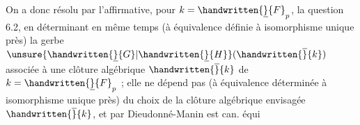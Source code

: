  On a donc  résolu par l'affirmative, pour $k=\handwritten{\underline}{F}_p$, la question 6.2, en déterminant en même temps (à équivalence définie à isomorphisme unique près) la gerbe $\unsure{\handwritten{\underline}{G}|\handwritten{\underline}{H}}(\handwritten{\overline}{k})$ associée à une clôture algébrique $\handwritten{\overline}{k}$ de $k=\handwritten{\underline}{F}_p$ ;  elle ne dépend pas (à  équivalence déterminée à isomorphisme unique près) du choix de la clôture algébrique envisagée $\handwritten{\overline}{k}$, et par Dieudonné-Manin est can. équi%
